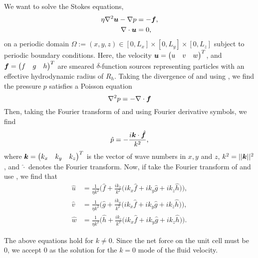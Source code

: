 We want to solve the Stokes equations,
\begin{align}
\displaystyle \eta \nabla^2 \boldsymbol u - \nabla p &= -\boldsymbol f, \label{momentum}\\
\nabla \cdot \boldsymbol u &= 0, \label{continuity}
\end{align}
on a periodic domain $\Omega := (x,y,z) \in[0,L_x] \times [0,L_y] \times [0,L_z]$ subject to periodic boundary conditions. Here, the velocity $\boldsymbol u = \begin{pmatrix}u & v & w \end{pmatrix}^T$, and $\boldsymbol f = \begin{pmatrix}f & g & h \end{pmatrix}^T$ are smeared $\delta$-function sources representing particles with an effective hydrodynamic radius of $R_h$. Taking the divergence of  and using , we find the pressure $p$ satisfies a Poisson equation
\begin{equation}\label{poisson}
\nabla^2 p = -\nabla \cdot \boldsymbol{f}
\end{equation}
Then, taking the Fourier transform of  and using Fourier derivative symbols, we find
\begin{equation}\label{psol}
\hat{p} = \displaystyle -\frac{i\boldsymbol{k} \cdot \hat{\boldsymbol f}}{k^2},
\end{equation}
where $\boldsymbol k = \begin{pmatrix} k_x & k_y & k_z\end{pmatrix}^T$ is the vector of wave numbers in $x, y$ and $z$, $k^2 = ||\boldsymbol k||^2$, and $\hat{\cdot}$ denotes the Fourier transform. Now, if take the Fourier transform of  and use , we find that
\begin{align}
\hat{u} &= \displaystyle \frac{1}{\eta k^2}\Big(\hat{f} + \frac{ik_x}{k^2}\big(ik_x \hat{f} + ik_y \hat{g} + ik_z \hat{h}\big)\Big),\\
\hat{v} &= \displaystyle \frac{1}{\eta k^2}\Big(\hat{g} + \frac{ik_y}{k^2}\big(ik_x \hat{f} + ik_y \hat{g} + ik_z \hat{h}\big)\Big),\\
\hat{w} &= \displaystyle \frac{1}{\eta k^2}\Big(\hat{h} + \frac{ik_z}{k^2}\big(ik_x \hat{f} + ik_y \hat{g} + ik_z \hat{h}\big)\Big).
\end{align}

The above equations hold for $k \neq 0$. Since the net force on the unit cell must be 0, we accept 0 as the solution for the $k=0$ mode of the fluid velocity.


